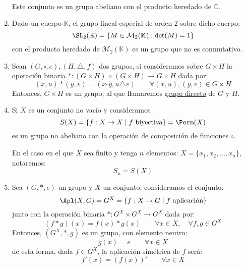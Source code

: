 \begin{ejemplo}
\begin{enumerate}
\begin{align*}
             \end{align*}
             Este conjunto es un grupo abeliano con el producto heredado de $\mathbb{C}$.
         \item Dado un cuerpo $\mathbb{K}$, el grupo lineal especial de orden 2 sobre dicho cuerpo:
             \begin{equation*}
                 \SL_2(\mathbb{K}) = \{M\in \mathcal{M}_2(\mathbb{K}) : \det(M) = 1\}
             \end{equation*}
             con el producto heredado de $\mathcal{M}_2(\mathbb{K})$ es un grupo que no es conmutativo.
         \item Sean $(G,\square,e),(H,\triangle,f)$ dos grupos, si consideramos sobre $G\times H$ la operación binaria $\ast:(G\times H)\times(G\times H)\rightarrow G\times H$  dada por:
             \begin{equation*}
                 (x,u) \ast (y,v) = (x\square y, u\triangle v) \qquad \forall (x,u),(y,v)\in G\times H
             \end{equation*}
             Entonces, $G\times H$ es un grupo, al que llamaremos \underline{grupo directo} de $G$ y $H$.
         \item Si $X$ es un conjunto no vacío y consideramos
             \begin{equation*}
                 S(X) = \{f:X\rightarrow X \mid f \text{\ biyectiva}\} = \Perm(X)
             \end{equation*}
             es un grupo no abeliano con la operación de composición de funciones $\circ$.

             En el caso en el que $X$ sea finito y tenga $n$ elementos: $X = \{x_1, x_2, \ldots, x_n\}$, notaremos:
             \begin{equation*}
                 S_n = S(X)
             \end{equation*}
         \item Sea $(G,\ast,e)$ un grupo y $X$ un conjunto, consideramos el conjunto:
             \begin{equation*}
                 \Apl(X,G) = G^X = \{f:X\rightarrow G \mid f \text{\ aplicación}\}
             \end{equation*}
             junto con la operación binaria $\ast:G^X\times G^X \rightarrow G^X$ dada por:
             \begin{equation*}
                 (f\ast g)(x) = f(x)\ast g(x) \qquad \forall x\in X, \quad \forall f,g\in G^X
             \end{equation*}
             Entonces, $(G^X, \ast, g)$ es un grupo, con elemento neutro:
             \begin{equation*}
                 g(x) = e \qquad \forall x\in X
             \end{equation*}
             de esta forma, dada $f\in G^X$, la aplicación simétrica de $f$ será:
             \begin{equation*}
                 f'(x) = {(f(x))}' \qquad \forall x\in X
             \end{equation*}


\end{enumerate}
\end{ejemplo}
